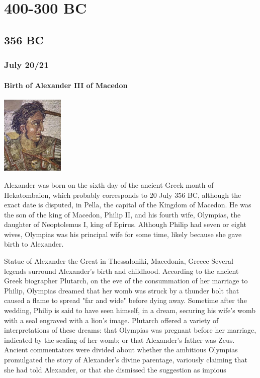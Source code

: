 \documentclass[11pt]{report}
\begin{document}
\part{400-300 BC}
\chapter{356 BC}
\section{July 20/21}
\subsection{Birth of Alexander III of Macedon}
\vspace{2mm}\begin{center}\includegraphics[width=3cm]{./img/alexanderTG.jpg}\end{center}
Alexander was born on the sixth day of the ancient Greek month of Hekatombaion, which probably corresponds to 20 July 356 BC, although the exact date is disputed, in Pella, the capital of the Kingdom of Macedon. He was the son of the king of Macedon, Philip II, and his fourth wife, Olympias, the daughter of Neoptolemus I, king of Epirus. Although Philip had seven or eight wives, Olympias was his principal wife for some time, likely because she gave birth to Alexander.


Statue of Alexander the Great in Thessaloniki, Macedonia, Greece
Several legends surround Alexander's birth and childhood. According to the ancient Greek biographer Plutarch, on the eve of the consummation of her marriage to Philip, Olympias dreamed that her womb was struck by a thunder bolt that caused a flame to spread "far and wide" before dying away. Sometime after the wedding, Philip is said to have seen himself, in a dream, securing his wife's womb with a seal engraved with a lion's image. Plutarch offered a variety of interpretations of these dreams: that Olympias was pregnant before her marriage, indicated by the sealing of her womb; or that Alexander's father was Zeus. Ancient commentators were divided about whether the ambitious Olympias promulgated the story of Alexander's divine parentage, variously claiming that she had told Alexander, or that she dismissed the suggestion as impious
\end{document}
